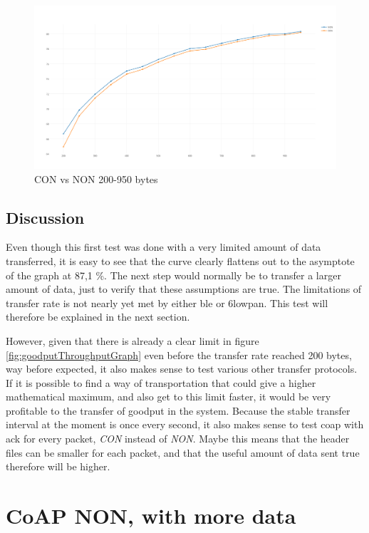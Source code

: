 \begin{figure}[ht]
    \centering
    \includegraphics[scale=0.35]{NON-CON_200-950GRAPH.png}    
    \caption{CON vs NON 200-950 bytes}
    \label{fig:CONvsNON200-950}
\end{figure}




\subsection{Discussion}

Even though this first test was done with a very limited amount of data transferred, it is easy to see that the curve clearly flattens out to the asymptote of the graph at 87,1 \%. The next step would normally be to transfer a larger amount of data, just to verify that these assumptions are true. The limitations of transfer rate is not nearly yet met by either \gls{ble} or \gls{6lowpan}. This test will therefore be explained in the next section. 

However, given that there is already a clear limit in figure \ref{fig:goodputThroughputGraph} even before the transfer rate reached 200 bytes, way before expected, it also makes sense to test various other transfer protocols. If it is possible to find a way of transportation that could give a higher mathematical maximum, and also get to this limit faster, it would be very profitable to the transfer of goodput in the system. Because the stable transfer interval at the moment is once every second, it also makes sense to test \gls{coap} with \gls{ack} for every packet, \textit{CON} instead of \textit{NON}. Maybe this means that the header files can be smaller for each packet, and that the useful amount of data sent true therefore will be higher. 


\section{CoAP NON, with more data}

